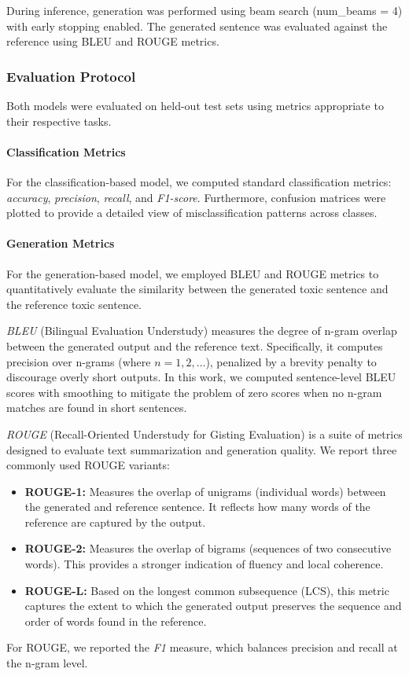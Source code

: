 \documentclass[conference]{IEEEtran}
\begin{document}
During inference, generation was performed using beam search (num\_beams = 4) with early stopping enabled. The generated sentence was evaluated against the reference using BLEU and ROUGE metrics.

\subsubsection{Evaluation Protocol}

Both models were evaluated on held-out test sets using metrics appropriate to their respective tasks.

\paragraph{Classification Metrics}
For the classification-based model, we computed standard classification metrics: \emph{accuracy}, \emph{precision}, \emph{recall}, and \emph{F1-score}. Furthermore, confusion matrices were plotted to provide a detailed view of misclassification patterns across classes.

\paragraph{Generation Metrics}
For the generation-based model, we employed BLEU and ROUGE metrics to quantitatively evaluate the similarity between the generated toxic sentence and the reference toxic sentence.

\emph{BLEU} (Bilingual Evaluation Understudy) \cite{BLEU2002} measures the degree of n-gram overlap between the generated output and the reference text. Specifically, it computes precision over n-grams (where $n=1,2,\dots$), penalized by a brevity penalty to discourage overly short outputs. In this work, we computed sentence-level BLEU scores with smoothing to mitigate the problem of zero scores when no n-gram matches are found in short sentences.

\emph{ROUGE} (Recall-Oriented Understudy for Gisting Evaluation) \cite{ROUGE2004} is a suite of metrics designed to evaluate text summarization and generation quality. We report three commonly used ROUGE variants:
\begin{itemize}
    \item \textbf{ROUGE-1:} Measures the overlap of unigrams (individual words) between the generated and reference sentence. It reflects how many words of the reference are captured by the output.
    \item \textbf{ROUGE-2:} Measures the overlap of bigrams (sequences of two consecutive words). This provides a stronger indication of fluency and local coherence.
    \item \textbf{ROUGE-L:} Based on the longest common subsequence (LCS), this metric captures the extent to which the generated output preserves the sequence and order of words found in the reference.
\end{itemize}
For ROUGE, we reported the \emph{F1} measure, which balances precision and recall at the n-gram level.
\end{document}
